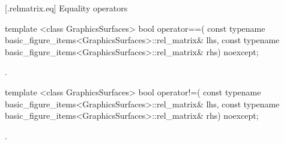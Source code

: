 [\iotwod.relmatrix.eq] {Equality operators}%

%
\begin{itemdecl}
template <class GraphicsSurfaces>
bool operator==(
  const typename basic_figure_items<GraphicsSurfaces>::rel_matrix& lhs,
  const typename basic_figure_items<GraphicsSurfaces>::rel_matrix& rhs)
  noexcept;
\end{itemdecl}
\begin{itemdescr}
\pnum
\returns {}.
\end{itemdescr}

%
\begin{itemdecl}
template <class GraphicsSurfaces>
bool operator!=(
  const typename basic_figure_items<GraphicsSurfaces>::rel_matrix& lhs,
  const typename basic_figure_items<GraphicsSurfaces>::rel_matrix& rhs)
  noexcept;
\end{itemdecl}
\begin{itemdescr}
\pnum
\returns {}.
\end{itemdescr}
